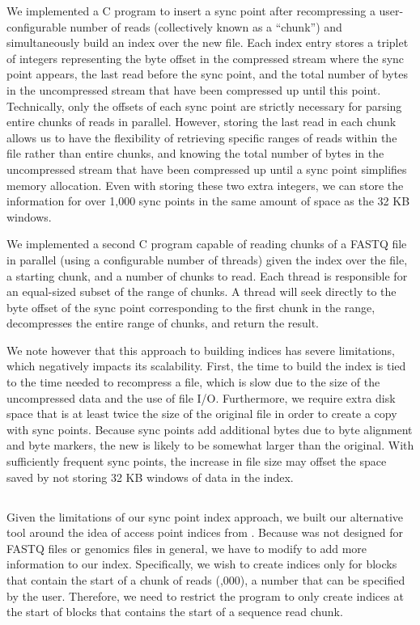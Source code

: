 We implemented a C program to insert a sync point after recompressing a user-configurable number of 
reads (collectively known as a ``chunk'') and simultaneously build an index over the new file. Each 
index entry stores a triplet of integers representing the byte offset in the compressed stream where 
the sync point appears, the last read before the sync point, and the total number of bytes in the 
uncompressed stream that have been compressed up until this point. Technically, only the offsets of 
each sync point are strictly necessary for parsing entire chunks of reads in parallel. However, storing 
the last read in each chunk allows us to have the flexibility of retrieving specific ranges of reads within 
the \gzip file rather than entire chunks, and knowing the total number of bytes in the uncompressed stream 
that have been compressed up until a sync point simplifies memory allocation. Even with storing these two
extra integers, we can store the information for over 1,000 sync points in the same amount of space as the
32 KB windows. 

We implemented a second C program capable of reading chunks of a \gzip FASTQ file in parallel (using a
configurable number of threads) given the index over the file, a starting chunk, and a number of chunks 
to read. Each thread is responsible for an equal-sized subset of the range of chunks. A thread will
seek directly to the byte offset of the sync point corresponding to the first chunk in the range, 
decompresses the entire range of chunks, and return the result.

We note however that this approach to building indices has severe limitations, which negatively
impacts its scalability. First, the time to build the index is tied to the
time needed to recompress a \gzip file, which is slow due to the size of the uncompressed data
and the use of file I/O. Furthermore, we require extra disk space that is at least twice the
size of the original \gzip file in order to create a copy with sync points. Because sync points
add additional bytes due to byte alignment and byte markers, the new \gzip is likely to be
somewhat larger than the original. With sufficiently frequent sync points, the increase in file
size may offset the space saved by not storing 32 KB windows of data in the index.

\subsection{\ibuilder}
\label{sec:ibuilder}
Given the limitations of our sync point index approach, we built our alternative \ibuilder 
tool around the idea of access point indices from \zran. Because \zran was not designed for 
FASTQ files or genomics files in general, we have to modify \zran to add more information to 
our index. Specifically, we wish to create indices only for \gzip blocks that contain the 
start of a chunk of reads (,000), a number that can be specified by the user. 
Therefore, we need to restrict the program to only create indices at the start of 
blocks that contains the start of a sequence read chunk.

